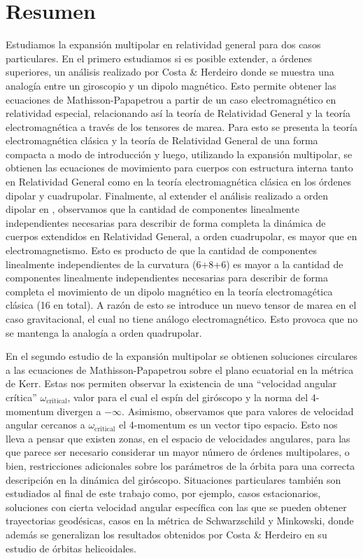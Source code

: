 \chapter*{Resumen}

Estudiamos la expansión multipolar en relatividad general para dos casos particulares. En el primero estudiamos si es posible extender, a órdenes superiores, un análisis realizado por Costa \& Herdeiro \cite{Costa-Herdeiro} donde se muestra una analogía entre un giroscopio y un dipolo magnético. Esto permite obtener las ecuaciones de Mathisson-Papapetrou a partir de un caso electromagnético en relatividad especial, relacionando así la teoría de Relatividad General y la teoría electromagnética a través de los tensores de marea. Para esto se presenta la teoría electromagnética clásica y la teoría de Relatividad General de una forma compacta a modo de introducción y luego, utilizando la expansión multipolar, se obtienen las ecuaciones de movimiento para cuerpos con estructura interna tanto en Relatividad General como en la teoría electromagnética clásica en los órdenes dipolar y cuadrupolar. Finalmente, al extender el análisis realizado a orden dipolar en \cite{Costa-Herdeiro}, observamos que la cantidad de componentes linealmente independientes necesarias para describir de forma completa la dinámica de cuerpos extendidos en Relatividad General, a orden cuadrupolar,  es mayor que en electromagnetismo. Esto es producto de que la cantidad de componentes linealmente independientes de la curvatura (6+8+6) es mayor a la cantidad de componentes linealmente independientes necesarias para describir de forma completa el movimiento de un dipolo magnético en la teoría electromagética clásica (16 en total). A razón de esto se introduce un nuevo tensor de marea en el caso gravitacional, el cual no tiene análogo electromagnético. Esto provoca que no se mantenga la analogía a orden quadrupolar.

En el segundo estudio de la expansión multipolar se obtienen soluciones circulares a las ecuaciones de Mathisson-Papapetrou sobre el plano ecuatorial en la métrica de Kerr. Estas nos permiten observar la existencia de una ``velocidad angular crítica'' $\omega_{\mathrm{critical}}$, valor para el cual el espín del giróscopo y la norma del 4-momentum divergen a $-\infty$. Asimismo, observamos que para valores de velocidad angular cercanos a $\omega_{\mathrm{critical}}$ el 4-momentum es un vector tipo espacio. Esto nos lleva a pensar que existen zonas, en el espacio de velocidades angulares, para las que parece ser necesario considerar un mayor número de órdenes multipolares, o bien, restricciones adicionales sobre los parámetros de la órbita para una correcta descripción en la dinámica del giróscopo. Situaciones particulares también son estudiados al final de este trabajo como, por ejemplo, casos estacionarios, soluciones con cierta velocidad angular específica con las que se pueden obtener trayectorias geodésicas, casos en la métrica de Schwarzschild y Minkowski, donde además se generalizan los resultados obtenidos por Costa \& Herdeiro en su estudio de órbitas helicoidales.